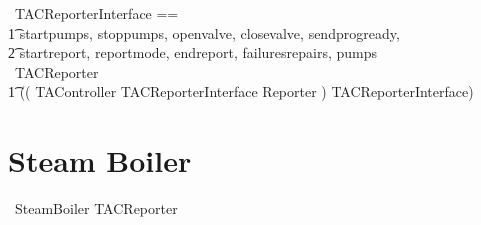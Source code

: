 \documentclass{report} %
\begin{document}
\begin{circus}

   \circchannelset\ TACReporterInterface == \\
        \t1 \lchanset startpumps, stoppumps, openvalve, closevalve, sendprogready, \\
            \t2 startreport, reportmode, endreport, failuresrepairs, pumps \rchanset  \\

   \circprocess\ TACReporter \circdef \\
    \t1 (( TAController  \lpar TACReporterInterface \rpar  Reporter ) \circhide TACReporterInterface)
\end{circus}
\chapter{Steam Boiler}
\begin{circus}
  \circprocess\ SteamBoiler \circdef TACReporter
\end{circus}

% 
% 
\end{document}
